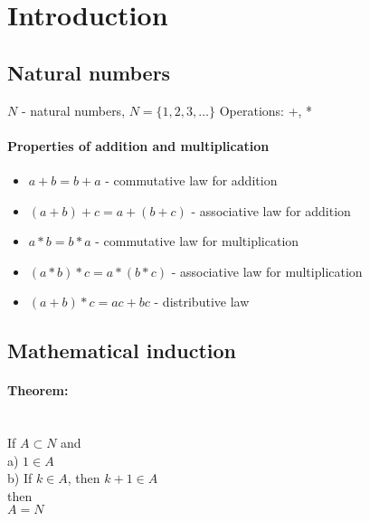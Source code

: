 \documentclass{article}
\begin{document}
\tableofcontents

\section{Introduction}

\subsection{Natural numbers}

$N$ - natural numbers, $N = \{1, 2, 3, \dots\}$
Operations: +, *
\paragraph{Properties of addition and multiplication}
\begin{itemize}
    \item $a + b = b + a$ - commutative law for addition
    \item $(a + b) + c = a + (b + c)$ - associative law for addition
    \item $a * b = b * a$ - commutative law for multiplication
    \item $(a * b) * c = a * (b * c)$ - associative law for multiplication
    \item $(a + b) * c = ac + bc$ - distributive law
\end{itemize}

\subsection{Mathematical induction}

\paragraph{Theorem:}\mbox{} \\
If $A \subset N$ and\\
\indent a) $1 \in A$\\
\indent b) If $k \in A$, then $k + 1 \in A$\\
then\\
\indent $A = N$
\end{document}
